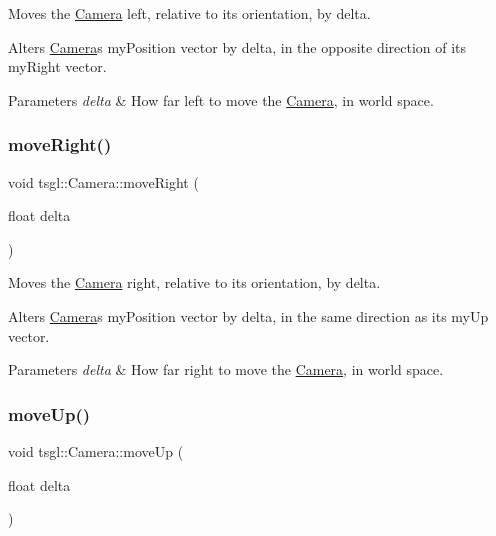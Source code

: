Moves the \hyperlink{classtsgl_1_1_camera}{Camera} left, relative to its orientation, by delta. 

Alters \hyperlink{classtsgl_1_1_camera}{Camera}\textquotesingle{}s my\+Position vector by delta, in the opposite direction of its my\+Right vector. 
\begin{DoxyParams}{Parameters}
{\em delta} & How far left to move the \hyperlink{classtsgl_1_1_camera}{Camera}, in world space. \\
\hline
\end{DoxyParams}
\mbox{\label{classtsgl_1_1_camera_ab69a0968bb1076b9303c6d10c07bbd75}} 
\subsubsection{\texorpdfstring{move\+Right()}{moveRight()}}
{\footnotesize\ttfamily void tsgl\+::\+Camera\+::move\+Right (\begin{DoxyParamCaption}\item[{float}]{delta }\end{DoxyParamCaption})}



Moves the \hyperlink{classtsgl_1_1_camera}{Camera} right, relative to its orientation, by delta. 

Alters \hyperlink{classtsgl_1_1_camera}{Camera}\textquotesingle{}s my\+Position vector by delta, in the same direction as its my\+Up vector. 
\begin{DoxyParams}{Parameters}
{\em delta} & How far right to move the \hyperlink{classtsgl_1_1_camera}{Camera}, in world space. \\
\hline
\end{DoxyParams}
\mbox{\label{classtsgl_1_1_camera_a60a565d006b727c305567d36b13e6e08}} 
\subsubsection{\texorpdfstring{move\+Up()}{moveUp()}}
{\footnotesize\ttfamily void tsgl\+::\+Camera\+::move\+Up (\begin{DoxyParamCaption}\item[{float}]{delta }\end{DoxyParamCaption})}



